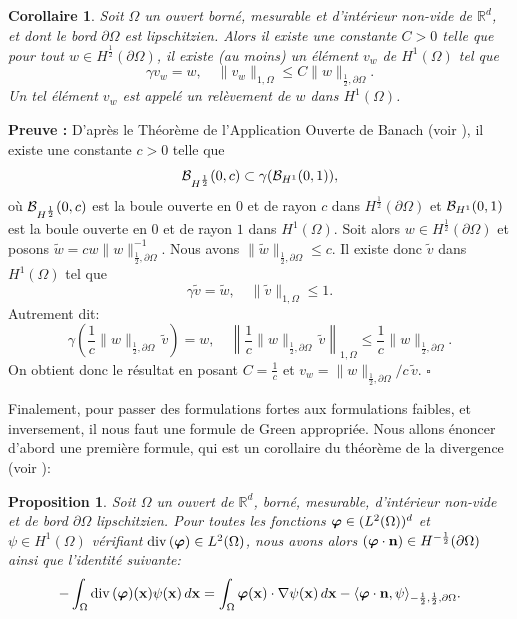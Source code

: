 \documentclass[11pt]{book}
\newtheorem{corollary}[theorem]{Corollaire}
\newtheorem{proposition}[theorem]{Proposition}
\newcommand{\bc}{\begin{corollary}}
\newcommand{\ec}{\end{corollary}}
\newcommand{\bp}{\begin{proposition}}
\newcommand{\ep}{\end{proposition}}
\newcommand{\pf}{\textbf{Preuve : }}
\newcommand{\cqfd}{{$\mbox{}$\hfill$\square$}}
\def\n{{\bf n}}
\def\x{{\bf x}}
\newcommand{\caB}{{\cal B}}
\newcommand{\R}{\mathbb{R}}
\newcommand{\bphi}{\mbox{\boldmath{$\varphi$}}}
\renewcommand{\div} {{\rm{div} \,}}
\begin{document}
\bc
 \label{cor:relevement}
Soit $\Omega$ un ouvert borné, mesurable et d'intérieur non-vide de $\R^d$, et dont le  bord $\partial \Omega$ est lipschitzien. 
Alors il existe une constante $C>0$ telle que pour tout 
$w \in H^{\frac12} (\partial \Omega)$, il existe (au moins) un élément $v_w$ de $H^1(\Omega)$ tel que
\[
\gamma v_w  = w, \quad \| v_w \|_{1,\Omega} \leq C \| w \|_{\frac12,\partial \Omega}.
\]
Un tel élément $v_w$ est appelé un \emph{relèvement} de $w$ dans $H^1(\Omega)$.
\ec

\pf D'après le Théorème de l'Application Ouverte de Banach (voir \cite[Théorème II.5]{brezis-83}), il existe une constante $c>0$ telle que
\[
 \caB_{H^{\frac12}}(0,c) \subset \gamma ( \caB_{H^1}(0,1) ), 
\]
où $\caB_{H^{\frac12}}(0,c)$ est la boule ouverte en $0$ et de rayon $c$ dans $H^{\frac12}(\partial \Omega)$ et $\caB_{H^1}(0,1)$ est la boule ouverte en $0$ et de rayon $1$ dans $H^1(\Omega)$.
Soit alors $w \in H^{\frac12} (\partial \Omega)$ et posons $\tilde w = c w  \| w \|_{\frac12,\partial \Omega}^{-1}$. Nous avons $\| \tilde w \|_{\frac12,\partial \Omega} \leq c$. Il existe donc $\tilde v$ dans $H^1(\Omega)$ tel que 
\[
 \gamma \tilde v = \tilde w, \quad \|\tilde v \|_{1,\Omega} \leq 1.
\]
Autrement dit:
\[
 \gamma \left ( \frac1c \| w \|_{\frac12,\partial \Omega} \, \tilde v \right ) = w, 
 \quad \left \|  \frac1c \| w \|_{\frac12,\partial \Omega} \, \tilde v \right \|_{1,\Omega} 
 \leq \frac1c \| w \|_{\frac12,\partial \Omega}.
\]
On obtient donc le résultat en posant $C = \frac1c$ et $v_w = \| w \|_{\frac12,\partial \Omega}/c \, \tilde v$.
\cqfd

Finalement, pour passer des formulations fortes aux formulations faibles, et inversement, il nous faut une formule de Green appropriée. 
Nous allons énoncer d'abord une première formule, qui est un corollaire du théorème de la divergence (voir \cite[Lemma B.56, Corollary B.57]{ern-guermond-04}):
\bp \label{prop:div} Soit $\Omega$ un ouvert de $\R^d$, borné, mesurable, d'intérieur non-vide et de bord $\partial \Omega$ lipschitzien. Pour toutes les fonctions $\bphi \in (L^2(\Omega))^d$ et $\psi \in H^1(\Omega)$ vérifiant $\div ( \bphi) \in L^2(\Omega)$, nous avons alors $(\bphi \cdot \n) \in H^{-\frac12}(\partial \Omega)$ ainsi que l'identité suivante:
\[
- \int_\Omega \div (\bphi) (\x) \psi(\x) \,d\x 
= 
\int_\Omega \bphi (\x) \cdot \nabla \psi (\x) \,d\x
- \langle \bphi \cdot \n , \psi \rangle_{-\frac12,\frac12,\partial \Omega}.
\]
\ep
\end{document}
